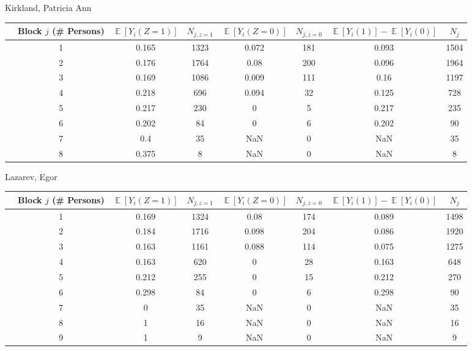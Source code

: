 \documentclass[11pt,notitlepage]{article}
\def\E{\mathop{\mathbb{E}}}
\begin{document}
Kirkland, Patricia Ann


\begin{table}[h!]\small
\begin{center}
\begin{tabular}{rc|cc|cc|cc}
  \hline
 & Block $j$ (\# Persons) & $\E[Y_i(Z=1)]$ & $N_{j, z=1}$ & $\E[Y_i(Z=0)]$ & $N_{j, z=0}$ & $\E[Y_i(1)]-\E[Y_i(0)]$ & $N_j$ \\ 
  \hline
  & 1 & 0.165 & 1323 & 0.072 & 181 & 0.093 & 1504 \\ 
  & 2 & 0.176 & 1764 & 0.08 & 200 & 0.096 & 1964 \\ 
  & 3 & 0.169 & 1086 & 0.009 & 111 & 0.16 & 1197 \\ 
  & 4 & 0.218 & 696 & 0.094 & 32 & 0.125 & 728 \\ 
  & 5 & 0.217 & 230 & 0 & 5 & 0.217 & 235 \\ 
  & 6 & 0.202 & 84 & 0 & 6 & 0.202 & 90 \\ 
  & 7 & 0.4 & 35 & NaN & 0 & NaN & 35 \\ 
  & 8 & 0.375 & 8 & NaN & 0 & NaN & 8 \\ 
   \hline
\end{tabular}
\end{center}
\end{table}




Lazarev, Egor


\begin{table}[h!]\small
\begin{center}
\begin{tabular}{rc|cc|cc|cc}
  \hline
 & Block $j$ (\# Persons) & $\E[Y_i(Z=1)]$ & $N_{j, z=1}$ & $\E[Y_i(Z=0)]$ & $N_{j, z=0}$ & $\E[Y_i(1)]-\E[Y_i(0)]$ & $N_j$ \\ 
  \hline
  & 1 & 0.169 & 1324 & 0.08 & 174 & 0.089 & 1498 \\ 
  & 2 & 0.184 & 1716 & 0.098 & 204 & 0.086 & 1920 \\ 
  & 3 & 0.163 & 1161 & 0.088 & 114 & 0.075 & 1275 \\ 
  & 4 & 0.163 & 620 & 0 & 28 & 0.163 & 648 \\ 
  & 5 & 0.212 & 255 & 0 & 15 & 0.212 & 270 \\ 
  & 6 & 0.298 & 84 & 0 & 6 & 0.298 & 90 \\ 
  & 7 & 0 & 35 & NaN & 0 & NaN & 35 \\ 
  & 8 & 1 & 16 & NaN & 0 & NaN & 16 \\ 
  & 9 & 1 & 9 & NaN & 0 & NaN & 9 \\ 
   \hline
\end{tabular}
\end{center}
\end{table}
\end{document}
